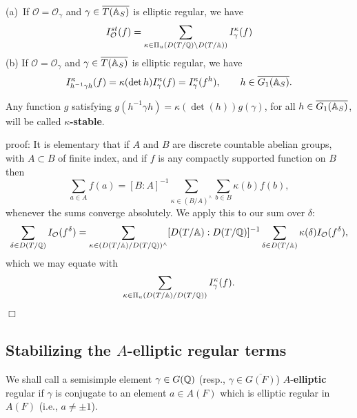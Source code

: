 \begin{lemma}
(a)\ If $\mathcal{O}=\mathcal{O}_\gamma $ and
$\gamma \in \overline{T({\Bbb{A}}_S)}$ is
elliptic regular, we have 
\[
I^{st}_{\mathcal{O}}(f)
=\sum_{\kappa \in \Pi _u(D(T/{\Bbb Q})\backslash D(T/{\Bbb{A}}))}
I_\gamma ^\kappa (f)
\]
(b) If $\mathcal{O}=\mathcal{O}_\gamma $ and
$\gamma \in \overline{T({\Bbb{A}}_S)}$ is elliptic regular, we have 
\[
I_{h^{-1}\gamma h}^\kappa (f)=\kappa (\det h)I_\gamma ^\kappa (f)
=I_\gamma^\kappa (f^h),\ \ \ \ \ \ h\in \overline{G_1({\Bbb{A}}_S)}.
\]
\end{lemma}

Any function $g$ satisfying $g(h^{-1}\gamma h)=\kappa (\det (h))g(\gamma )$,
for all $h\in \overline{G_1({\Bbb{A}}_S)}$, will be called
\textbf{$\kappa $-stable}.

proof: It is elementary that if $A$ and $B$ are
discrete countable abelian groups, with $A\subset B$ of finite
index, and if $f$ is any compactly supported function on $B$ then 
\begin{equation}
\sum_{a\in A}f(a)=[B:A]^{-1}\sum_{\kappa \in (B/A)^{\wedge }}\sum_{b\in
B}\kappa (b)f(b),
\end{equation}
whenever the sums converge absolutely. We apply this to our
sum over $\delta $: 
\[
\sum_{\delta \in D(T/{\Bbb{Q}})}
I_{\cal{O}}(f^\delta)
=
\sum_{\kappa \in (D(T/{\Bbb{A}})/D(T/{\Bbb{Q}}))^{\wedge}}
[D(T/{\Bbb{A}}):D(T/{\Bbb{Q}})]^{-1}
\sum_{\delta \in D(T/{\Bbb{A}})}
\kappa (\delta )I_{\cal{O}}(f^\delta),
\]
which we may equate with
\begin{equation}
\sum_{\kappa \in \Pi_u(D(T/{\Bbb{A}})/D(T/{\Bbb{Q}}))}
I^\kappa_\gamma (f).
\end{equation}
$\Box$

\subsection{Stabilizing the $A$-elliptic regular terms}

We shall call a semisimple element
$\gamma \in G({\Bbb{Q}})$
(resp., $\gamma \in \overline{G(F)}$) $A$-\textbf{elliptic} regular if
$\gamma $ is conjugate to an element $a\in A(F)$
which is elliptic regular in $A(F)$ (i.e., $a\not= \pm 1$).

